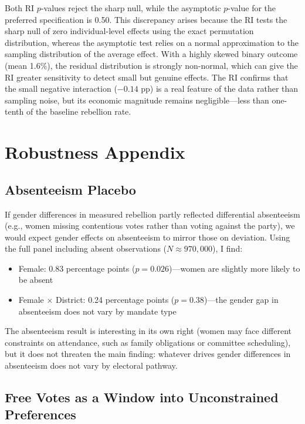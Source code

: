 \documentclass[12pt]{article}
\begin{document}
Both RI $p$-values reject the sharp null, while the asymptotic $p$-value for the preferred specification is 0.50. This discrepancy arises because the RI tests the sharp null of zero individual-level effects using the exact permutation distribution, whereas the asymptotic test relies on a normal approximation to the sampling distribution of the average effect. With a highly skewed binary outcome (mean 1.6\%), the residual distribution is strongly non-normal, which can give the RI greater sensitivity to detect small but genuine effects. The RI confirms that the small negative interaction ($-0.14$ pp) is a real feature of the data rather than sampling noise, but its economic magnitude remains negligible---less than one-tenth of the baseline rebellion rate.


\section{Robustness Appendix}\label{app:robust}

\subsection{Absenteeism Placebo}

If gender differences in measured rebellion partly reflected differential absenteeism (e.g., women missing contentious votes rather than voting against the party), we would expect gender effects on absenteeism to mirror those on deviation. Using the full panel including absent observations ($N \approx 970,000$), I find:
\begin{itemize}
\item Female: 0.83 percentage points ($p = 0.026$)---women are slightly more likely to be absent
\item Female $\times$ District: 0.24 percentage points ($p = 0.38$)---the gender gap in absenteeism does not vary by mandate type
\end{itemize}

The absenteeism result is interesting in its own right (women may face different constraints on attendance, such as family obligations or committee scheduling), but it does not threaten the main finding: whatever drives gender differences in absenteeism does not vary by electoral pathway.

\subsection{Free Votes as a Window into Unconstrained Preferences}
\end{document}
